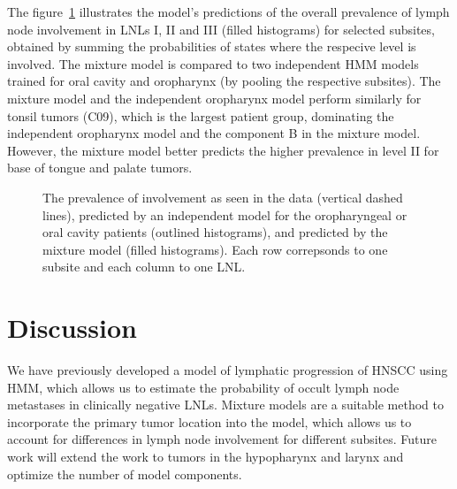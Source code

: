 \documentclass[11pt,twocolumn,twoside]{article}
\begin{document}
The figure~\ref{fig-prevalence-comparison} illustrates the model's
predictions of the overall prevalence of lymph node involvement in LNLs
I, II and III (filled histograms) for selected subsites, obtained by
summing the probabilities of states where the respecive level is
involved. The mixture model is compared to two independent HMM models
trained for oral cavity and oropharynx (by pooling the respective
subsites). The mixture model and the independent oropharynx model
perform similarly for tonsil tumors (C09), which is the largest patient
group, dominating the independent oropharynx model and the component B
in the mixture model. However, the mixture model better predicts the
higher prevalence in level II for base of tongue and palate tumors.

\begin{figure}


\caption{\label{fig-prevalence-comparison}The prevalence of involvement
as seen in the data (vertical dashed lines), predicted by an independent
model for the oropharyngeal or oral cavity patients (outlined
histograms), and predicted by the mixture model (filled histograms).
Each row correpsonds to one subsite and each column to one LNL.}

\end{figure}%

\section{Discussion}\label{sec-discussion}

We have previously developed a model of lymphatic progression of HNSCC
using HMM, which allows us to estimate the probability of occult lymph
node metastases in clinically negative LNLs. Mixture models are a
suitable method to incorporate the primary tumor location into the
model, which allows us to account for differences in lymph node
involvement for different subsites. Future work will extend the work to
tumors in the hypopharynx and larynx and optimize the number of model
components.

\printbibliography
\end{document}
